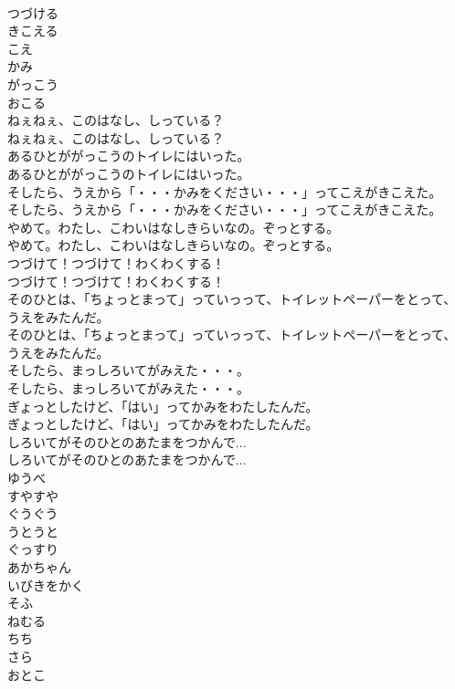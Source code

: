 \documentclass[8pt]{extreport}
\begin{document}
\begin{CJK}{UTF8}{min}
\\	つづける
\\	きこえる
\\	こえ
\\	かみ
\\	がっこう
\\	おこる
\\	ねぇねぇ、このはなし、しっている？	
\\	ねぇねぇ、このはなし、しっている？ 
\\	あるひとががっこうのトイレにはいった。	
\\	あるひとががっこうのトイレにはいった。 
\\	そしたら、うえから「・・・かみをください・・・」ってこえがきこえた。	
\\	そしたら、うえから「・・・かみをください・・・」ってこえがきこえた。 
\\	やめて。わたし、こわいはなしきらいなの。ぞっとする。	
\\	やめて。わたし、こわいはなしきらいなの。ぞっとする。 
\\	つづけて！つづけて！わくわくする！	
\\	つづけて！つづけて！わくわくする！ 
\\	そのひとは、「ちょっとまって」っていっって、トイレットペーパーをとって、うえをみたんだ。	
\\	そのひとは、「ちょっとまって」っていっって、トイレットペーパーをとって、うえをみたんだ。 
\\	そしたら、まっしろいてがみえた・・・。	
\\	そしたら、まっしろいてがみえた・・・。 
\\	ぎょっとしたけど、「はい」ってかみをわたしたんだ。	
\\	ぎょっとしたけど、「はい」ってかみをわたしたんだ。 
\\	しろいてがそのひとのあたまをつかんで...	
\\	しろいてがそのひとのあたまをつかんで... 
\\	ゆうべ
\\	すやすや
\\	ぐうぐう
\\	うとうと
\\	ぐっすり
\\	あかちゃん
\\	いびきをかく
\\	そふ
\\	ねむる
\\	ちち
\\	さら
\\	おとこ

\end{CJK}
\end{document}
